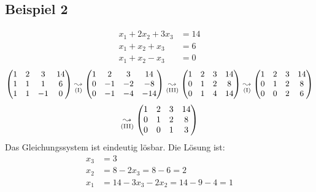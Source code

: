 \subsection{Beispiel 2}
\begin{align*}
x_1 + 2x_2 + 3x_3 &= 14 \\
x_1 + x_2 + x_3 &= 6 \\
x_1 + x_2 - x_3 &=0
\end{align*}
\[
\begin{pmatrix}
1 & 2 & 3 & 14 \\
1 & 1 & 1 & 6 \\
1 & 1 & -1 & 0 
\end{pmatrix}
\underset{\text{(\RM{1})}}{\leadsto} 
\begin{pmatrix}
1 & 2 & 3 & 14 \\
0 & -1 & -2 & -8 \\
0 & -1 & -4 & -14 
\end{pmatrix}
\underset{\text{(\RM{3})}}{\leadsto} 
\begin{pmatrix}
1 & 2 & 3 & 14 \\
0 & 1 & 2 & 8 \\
0 & 1 & 4 & 14 
\end{pmatrix}
\underset{\text{(\RM{1})}}{\leadsto} 
\begin{pmatrix}
1 & 2 & 3 & 14 \\
0 & 1 & 2 & 8 \\
0 & 0 & 2 & 6 
\end{pmatrix}
\]
\[
\underset{\text{(\RM{3})}}{\leadsto} 
\begin{pmatrix}
1 & 2 & 3 & 14 \\
0 & 1 & 2 & 8 \\
0 & 0 & 1 & 3 
\end{pmatrix}
\]
Das Gleichungssystem ist eindeutig lösbar. Die Lösung ist:
\begin{align*}
x_3 &= 3\\
x_2 &= 8- 2x_3 = 8-6 = 2 \\
x_1 &= 14 - 3x_3 -2x_2 = 14-9-4=1
\end{align*}


